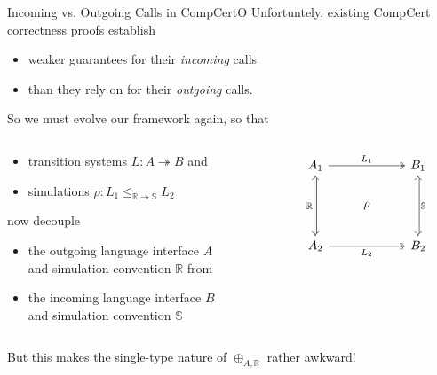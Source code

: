 \documentclass[aspectratio=1610,12pt]{beamer}
\begin{document}
\begin{frame}[fragile]{Incoming vs. Outgoing Calls in CompCertO} %
  Unfortuntely, existing CompCert correctness proofs establish
  \begin{itemize}
    \item weaker guarantees for their \emph{incoming} calls
    \item than they rely on for their \emph{outgoing} calls.
  \end{itemize}

  \vfill
  So we must evolve our framework again, so that
\begin{columns}
  \begin{column}{.55\textwidth}
    \begin{itemize}
      \item transition systems $L : A \twoheadrightarrow B$ and
      \item simulations $\rho : L_1 \le_{\mathbb{R} \twoheadrightarrow \mathbb{S}} L_2$
    \end{itemize}
    now decouple
    \begin{itemize}
      \item the outgoing language interface $A$ \\ and simulation convention $\mathbb{R}$ from
      \item the incoming language interface $B$ \\ and simulation convention $\mathbb{S}$
    \end{itemize}
  \end{column}
  \begin{column}{.4\textwidth}
    \[
      \begin{tikzcd}
        A_1 \ar[rr, twoheadrightarrow, "L_1"] \ar[dd, Leftrightarrow, "\mathbb{R}"'] && B_1 \ar[dd, Leftrightarrow, "\mathbb{S}"] \\
        & \rho \\
        A_2 \ar[rr, twoheadrightarrow, "L_2"'] && B_2
      \end{tikzcd}
    \]
  \end{column}
\end{columns}

  \vfill
  But this makes the single-type nature of $\oplus_{A,\mathbb{R}}$ rather awkward!
\end{frame}
\end{document}
